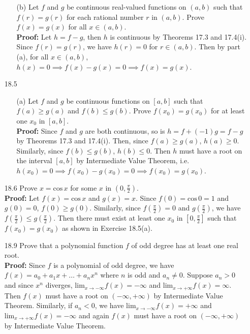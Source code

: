 \documentclass{article}
\begin{document}
\begin{itemize}
\begin{itemize}
              \item [(b)] Let $f$ and $g$ be continuous real-valued functions on $(a,b)$ such that $f(r)=g(r)$ for each rational number $r$ in $(a,b)$. Prove $f(x)=g(x)$ for all $x\in(a,b)$.\\\textbf{Proof: } Let $h=f-g$, then $h$ is continuous by Theorems 17.3 and 17.4(i). Since $f(r)=g(r)$, we have $h(r)=0$ for $r\in(a,b)$. Then by part (a), for all $x\in(a,b)$, $h(x)=0\implies f(x)-g(x)=0\implies f(x)=g(x)$.
          \end{itemize}
    \item [18.5]
          \begin{itemize}
              \item [(a)] Let $f$ and $g$ be continuous functions on $[a,b]$ such that $f(a)\geq g(a)$ and $f(b)\leq g(b)$. Prove $f(x_0)=g(x_0)$ for at least one $x_0$ in $[a,b]$.\\\textbf{Proof: } Since $f$ and $g$ are both continuous, so is $h=f+(-1)g=f-g$ by Theorems 17.3 and 17.4(i). Then, since $f(a)\geq g(a)$, $h(a)\geq 0$. Similarly, since $f(b)\leq g(b)$, $h(b)\leq 0$. Then $h$ must have a root on the interval $[a,b]$ by Intermediate Value Theorem, i.e. $h(x_0)=0\implies f(x_0)-g(x_0)=0\implies f(x_0)=g(x_0)$.
          \end{itemize}
    \item [18.6] Prove $x=\text{cos}\,x$ for some $x$ in $(0,\frac{\pi}{2})$.\\\textbf{Proof: } Let $f(x)=\text{cos}\,x$ and $g(x)=x$. Since $f(0)=\text{cos}\,0=1$ and $g(0)=0$, $f(0)\geq g(0)$. Similarly, since $f(\frac{\pi}{2})=0$ and $g(\frac{\pi}{2})$, we have $f(\frac{\pi}{2})\leq g(\frac{\pi}{2})$. Then there must exist at least one $x_0$ in $[0,\frac{\pi}{2}]$ such that $f(x_0)=g(x_0)$ as shown in Exercise 18.5(a).
    \item [18.9] Prove that a polynomial function $f$ of odd degree has at least one real root.\\\textbf{Proof: } Since $f$ is a polynomial of odd degree, we have $f(x)=a_0+a_1x+\ldots+a_nx^n$ where $n$ is odd and $a_n\neq 0$. Suppose $a_n>0$ and since $x^n$ diverges, $\text{lim}_{x\rightarrow-\infty}f(x)=-\infty$ and $\text{lim}_{x\rightarrow+\infty}f(x)=\infty$. Then $f(x)$ must have a root on $(-\infty,+\infty)$ by Intermediate Value Theorem. Similarly, if $a_n<0$, we have $\text{lim}_{x\rightarrow-\infty}f(x)=+\infty$ and $\text{lim}_{x\rightarrow+\infty}f(x)=-\infty$ and again $f(x)$ must have a root on $(-\infty,+\infty)$ by Intermediate Value Theorem.

\end{itemize}
\end{document}
